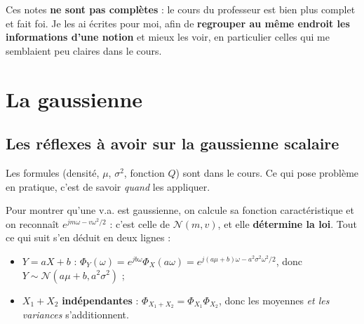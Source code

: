 \documentclass[11pt,a4paper,openany]{book}
\begin{document}
\raggedbottom


\begin{rembox}[title=Pourquoi ces notes ?]
Ces notes \textbf{ne sont pas complètes} : le cours du professeur est bien plus complet et
fait foi. Je les ai écrites pour moi, afin de \textbf{regrouper au même endroit les
informations d'une notion} et mieux les voir, en particulier celles qui me semblaient peu
claires dans le cours.
\end{rembox}

\tableofcontents
\clearpage

\chapter{La gaussienne}

\section{Les réflexes à avoir sur la gaussienne scalaire}

Les formules (densité, $\mu$, $\sigma^2$, fonction $Q$) sont dans le cours. Ce qui pose
problème en pratique, c'est de savoir \emph{quand} les appliquer.

\begin{keybox}[title={Le réflexe : la fonction caractéristique}]
Pour montrer qu'une v.a. est gaussienne, on calcule sa fonction caractéristique et on
reconnaît $e^{jm\omega - v\omega^2/2}$ : c'est celle de $\mathcal{N}(m,v)$, et elle
\textbf{détermine la loi}. Tout ce qui suit s'en déduit en deux lignes :
\begin{itemize}
\item $Y=aX+b$ : $\Phi_Y(\omega) = e^{jb\omega}\Phi_X(a\omega) = e^{j(a\mu+b)\omega -
  a^2\sigma^2\omega^2/2}$, donc $Y\sim\mathcal{N}(a\mu+b,a^2\sigma^2)$ ;
\item $X_1+X_2$ \textbf{indépendantes} : $\Phi_{X_1+X_2}=\Phi_{X_1}\Phi_{X_2}$, donc les moyennes
  \emph{et les variances} s'additionnent.
\end{itemize}
\end{keybox}
\end{document}
